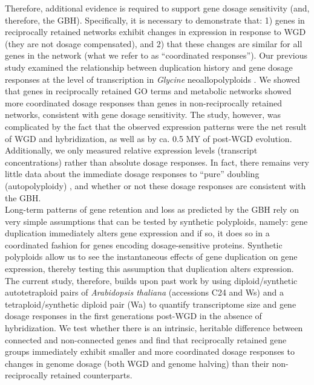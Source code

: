 \documentclass[11pt]{article}
\begin{document}
Therefore, additional evidence is required to support gene dosage sensitivity (and, therefore, the GBH).
Specifically, it is necessary to demonstrate that: 1) genes in reciprocally retained networks exhibit changes in expression in response to WGD (they are not dosage compensated), and 2) that these changes are similar for all genes in the network (what we refer to as ``coordinated responses'').
Our previous study examined the relationship between duplication history and gene dosage responses at the level of transcription in \textit{Glycine} neoallopolyploids \citep{coate2016}.
We showed that genes in reciprocally retained GO terms and metabolic networks showed more coordinated dosage responses than genes in non-reciprocally retained networks, consistent with gene dosage sensitivity.
The \cite{coate2016} study, however, was complicated by the fact that the observed expression patterns were the net result of WGD and hybridization, as well as by ca. 0.5 MY of post-WGD evolution.
Additionally, we only measured relative expression levels (transcript concentrations) rather than absolute dosage responses.
In fact, there remains very little data about the immediate dosage responses to ``pure'' doubling (autopolyploidy) \citep{spoelhof2017}, and whether or not these dosage responses are consistent with the GBH.\\

Long-term patterns of gene retention and loss as predicted by the GBH rely on very simple assumptions that can be tested by synthetic polyploids, namely: gene duplication immediately alters gene expression and if so, it does so in a coordinated fashion for genes encoding dosage-sensitive proteins.
Synthetic polyploids allow us to see the instantaneous effects of gene duplication on gene expression, thereby testing this assumption that duplication alters expression.
The current study, therefore, builds upon past work by using diploid/synthetic autotetraploid pairs of \textit{Arabidopsis thaliana} (accessions C24 and Ws) and a tetraploid/synthetic diploid pair (Wa) to quantify transcriptome size and gene dosage responses in the first generations post-WGD in the absence of hybridization.
We test whether there is an intrinsic, heritable difference between connected and non-connected genes and find that reciprocally retained gene groups immediately exhibit smaller and more coordinated dosage responses to changes in genome dosage (both WGD and genome halving) than their non-reciprocally retained counterparts.\\
\end{document}

